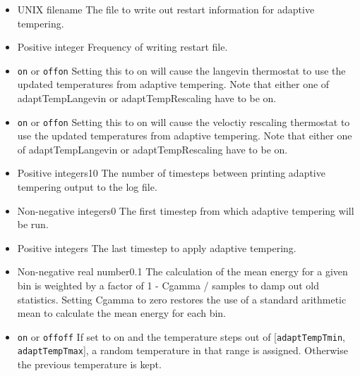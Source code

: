 \begin{itemize}
\item
{}
{UNIX filename}
{The file to write out restart information for adaptive tempering.
}

\item
{}
{Positive integer}
{Frequency of writing restart file.
}

\item
{}
{{\tt on} or {\tt off}}{{\tt on}}
{Setting this to on will cause the langevin thermostat to use the updated temperatures from adaptive tempering. Note that either one of adaptTempLangevin or adaptTempRescaling have to be on.
}

\item
{}
{{\tt on} or {\tt off}}{{\tt on}}
{Setting this to on will cause the veloctiy rescaling thermostat to use the updated temperatures from adaptive tempering.  Note that either one of adaptTempLangevin or adaptTempRescaling have to be on.
}

\item
{}
{Positive integers}{10}
{The number of timesteps between printing adaptive tempering output to the log file.
}

\item
{}
{Non-negative integers}{0}
{The first timestep from which adaptive tempering will be run.}

\item
{}
{Positive integers}
{The last timestep to apply adaptive tempering.}

\item
{}
{Non-negative real number}{0.1}
{The calculation of the mean energy for a given bin is weighted by a factor of 1 - Cgamma / samples to damp out old statistics. Setting Cgamma to zero restores the use of a standard arithmetic mean to calculate the mean energy for each bin.}

\item
{}
{{\tt on} or {\tt off}}{{\tt off}}
{If set to on and the temperature steps out of [{\tt adaptTempTmin}, {\tt adaptTempTmax}], a random temperature in that range is assigned. Otherwise the previous temperature is kept.
}


\end{itemize}


